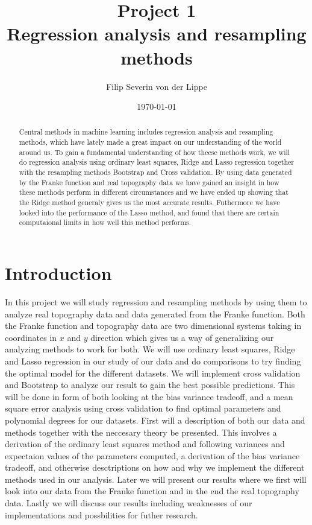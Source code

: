 \documentclass[12pt]{article}
\title{Project 1\\ Regression analysis and resampling methods}
\author{Filip Severin von der Lippe}
\date{\today}
\begin{document}
\maketitle
\begin{abstract}
  Central methods in machine learning includes regression analysis and resampling methods, which have lately made a great impact on our understanding of the world around us. To gain a fundamental understanding of how theese methods work, we will do regression analysis using ordinary least squares, Ridge and Lasso regression together with the resampling methods Bootstrap and Cross validation. By using data generated by the Franke function and real topography data we have gained an insight in how these methods perform in different circumstances and we have ended up showing that the Ridge method generaly gives us the most accurate results. Futhermore we have looked into the performance of the Lasso method, and found that there are certain computaional limits in how well this method performs.
\end{abstract}
\newpage
\tableofcontents
\section{Introduction}
In this project we will study regression and resampling methods by using them to analyze real topography data and data generated from the Franke function. Both the Franke function and topography data are two dimensional systems taking in coordinates in $x$ and $y$ direction which gives us a way of generalizing our analyzing methods to work for both. We will use ordinary least squares, Ridge and Lasso regression in our study of our data and do comparisons to try finding the optimal model for the different datasets. We will implement cross validation and Bootstrap to analyze our result to gain the best possible predictions. This will be done in form of both looking at the bias variance tradeoff, and a mean square error analysis using cross validation to find optimal parameters and polynomial degrees for our datasets. First will a description of both our data and methods together with the neccesary theory be presented. This involves a derivation of the ordinary least squares method and following variances and expectaion values of the parameters computed, a derivation of the bias variance tradeoff, and otherwise desctriptions on how and why we implement the different methods used in our analysis. Later we will present our results where we first will look into our data from the Franke function and in the end the real topography data. Lastly we will discuss our results including weaknesses of our implementations and possbilities for futher research.
\end{document}
